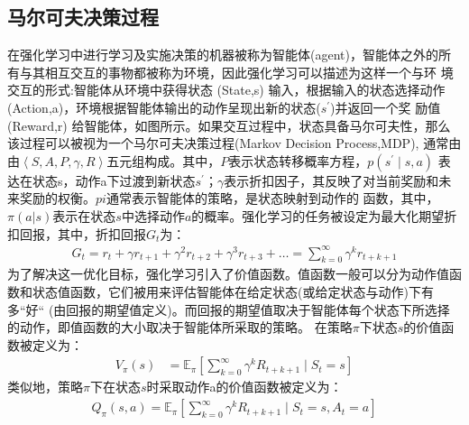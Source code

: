\subsection{马尔可夫决策过程}
在强化学习中进行学习及实施决策的机器被称为智能体(agent)，智能体之外的所有与其相互交互的事物都被称为环境，因此强化学习可以描述为这样一个与环
境交互的形式:智能体从环境中获得状态 (State,s) 输入，根据输入的状态选择动作(Action,a)，环境根据智能体输出的动作呈现出新的状态($s^{'}$)并返回一个奖
励值 (Reward,r) 给智能体，如图所示。如果交互过程中，状态具备马尔可夫性，那么该过程可以被视为一个马尔可夫决策过程(Markov Decision Process,MDP),
通常由由$\left \langle S,A,P,\gamma,R \right \rangle$五元组构成。其中，$P$表示状态转移概率方程，$p\left(s^{\prime} \mid s, a\right)$
表达在状态s，动作a下过渡到新状态$s^{'}$；$\gamma$表示折扣因子，其反映了对当前奖励和未来奖励的权衡。$pi$通常表示智能体的策略，是状态映射到动作的
函数，其中，$\pi(a|s)$表示在状态$s$中选择动作$a$的概率。强化学习的任务被设定为最大化期望折扣回报，其中，折扣回报$G_{t}$为：
\begin{align}
    G_{t} = r_{t}+\gamma r_{t+1}+\gamma^{2} r_{t+2}+\gamma^{3} r_{t+3}+\ldots= \sum_{k = 0}^{\infty}\gamma^{k}r_{t+k+1} 
\end{align}
为了解决这一优化目标，强化学习引入了价值函数。值函数一般可以分为动作值函数和状态值函数，它们被用来评估智能体在给定状态(或给定状态与动作)下有多“好“
(由回报的期望值定义)。而回报的期望值取决于智能体每个状态下所选择的动作，即值函数的大小取决于智能体所采取的策略。
在策略$\pi$下状态$s$的价值函数被定义为：
\begin{align}
    V_{\pi}\left(s\right) & = \mathbb{E}_{\pi }\left[\sum_{k = 0}^{\infty} \gamma^{k} R_{t+k+1}\mid S_{t}= s\right]
\end{align}
类似地，策略$\pi$下在状态$s$时采取动作a的价值函数被定义为：
\begin{align}
    Q_{\pi}\left(s, a\right) =\mathbb{E}_{\pi }\left[\sum_{k = 0}^{\infty} \gamma^{k} R_{t+k+1}\mid S_{t}= s,A_{t}=a\right]
\end{align}

